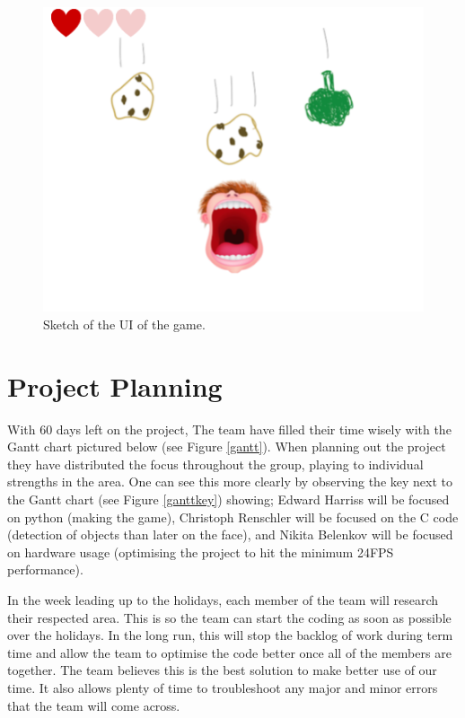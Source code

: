\begin{figure}[h]
\centering
\includegraphics[scale=1]{UI}
\caption{Sketch of the UI of the game.}
\label{UI}
\end{figure}

\section{Project Planning}

With 60 days left on the project, The team have filled their time wisely with the Gantt chart pictured below (see Figure \ref{gantt}). When planning out the project they have distributed the focus throughout the group, playing to individual strengths in the area. One can see this more clearly by observing the key next to the Gantt chart (see Figure \ref{ganttkey}) showing; Edward Harriss will be focused on python (making the game), Christoph Renschler will be focused on the C code (detection of objects than later on the face), and Nikita Belenkov will be focused on hardware usage (optimising the project to hit the minimum 24FPS performance).

	In the week leading up to the holidays, each member of the team will research their respected area. This is so the team can start the coding as soon as possible over the holidays. In the long run, this will stop the backlog of work during term time and allow the team to optimise the code better once all of the members are together. The team believes this is the best solution to make better use of our time. It also allows plenty of time to troubleshoot any major and minor errors that the team will come across.

